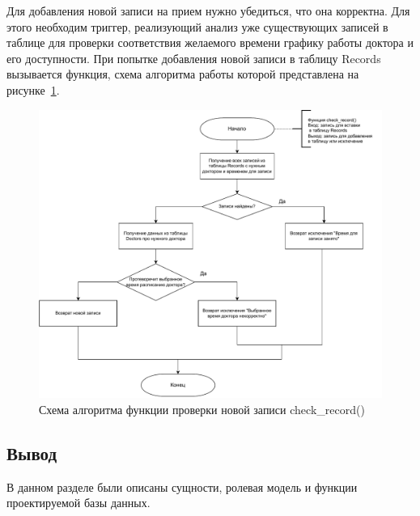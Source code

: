 Для добавления новой записи на прием нужно убедиться, что она корректна. Для этого необходим триггер, реализующий анализ уже существующих записей в таблице для проверки соответствия желаемого времени графику работы доктора и его доступности. При попытке добавления новой записи в таблицу Records вызывается функция, схема алгоритма работы которой представлена на рисунке~\ref{img:tr}.

\begin{figure}[hbtp]
	\centering
	\includegraphics[width=\textwidth]{image/tr.pdf}
	\caption{Схема алгоритма функции проверки новой записи check\_record()}
	\label{img:tr}
\end{figure}


\subsection*{Вывод}
В данном разделе были описаны сущности, ролевая модель и функции проектируемой базы данных.